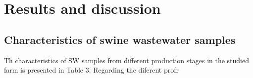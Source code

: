 \section{Results and discussion}
\subsection{Characteristics of swine wastewater samples}
Th characteristics of SW samples from different production stages in the studied farm is presented in Table 3. Regarding the diferent profr